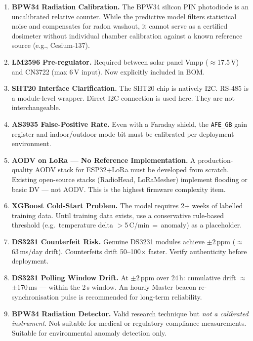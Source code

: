 \documentclass[12pt,a4paper]{article}
\begin{document}
\begin{enumerate}[leftmargin=*, label=\textbf{\arabic*.}]
    \item \textbf{BPW34 Radiation Calibration.} The BPW34 silicon PIN photodiode is an uncalibrated relative counter. While the predictive model filters statistical noise and compensates for radon washout, it cannot serve as a certified dosimeter without individual chamber calibration against a known reference source (e.g., Cesium-137).
    
    \item \textbf{LM2596 Pre-regulator.} Required between solar panel Vmpp ($\approx$17.5\,V) and CN3722 (max 6\,V input). Now explicitly included in BOM.
    
    \item \textbf{SHT20 Interface Clarification.} The SHT20 chip is natively I2C. RS-485 is a module-level wrapper. Direct I2C connection is used here. They are not interchangeable.
    
    \item \textbf{AS3935 False-Positive Rate.} Even with a Faraday shield, the \texttt{AFE\_GB} gain register and indoor/outdoor mode bit must be calibrated per deployment environment.
    
    \item \textbf{AODV on LoRa --- No Reference Implementation.} A production-quality AODV stack for ESP32+LoRa must be developed from scratch. Existing open-source stacks (RadioHead, LoRaMesher) implement flooding or basic DV --- not AODV. This is the highest firmware complexity item.
    
    \item \textbf{XGBoost Cold-Start Problem.} The model requires 2+ weeks of labelled training data. Until training data exists, use a conservative rule-based threshold (e.g.\ temperature delta $>$5\,\textdegree C/min\,$=$\,anomaly) as a placeholder.
    
    \item \textbf{DS3231 Counterfeit Risk.} Genuine DS3231 modules achieve $\pm$2\,ppm ($\approx$63\,ms/day drift). Counterfeits drift 50--100$\times$ faster. Verify authenticity before deployment.
    
    \item \textbf{DS3231 Polling Window Drift.} At $\pm$2\,ppm over 24\,h: cumulative drift $\approx$$\pm$170\,ms --- within the 2\,s window. An hourly Master beacon re-synchronisation pulse is recommended for long-term reliability.
    
    \item \textbf{BPW34 Radiation Detector.} Valid research technique but \textit{not a calibrated instrument}. Not suitable for medical or regulatory compliance measurements. Suitable for environmental anomaly detection only.
\end{enumerate}
\end{document}
